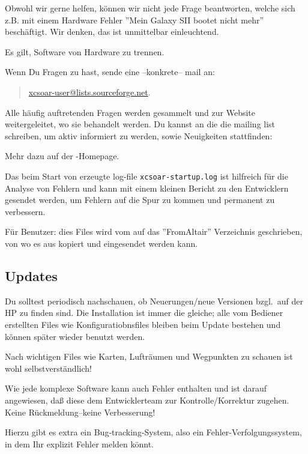 Obwohl wir gerne helfen, können wir nicht jede Frage beantworten, welche sich z.B. mit einem 
Hardware Fehler ''Mein  Galaxy SII bootet nicht mehr'' beschäftigt. Wir denken, das ist unmittelbar einleuchtend.

Es gilt, Software von Hardware zu trennen. 

Wenn Du Fragen zu \xc hast, sende eine --konkrete-- mail an: 

\begin{quote}
\url{xcsoar-user@lists.sourceforge.net}.
\end{quote}

Alle häufig auftretenden Fragen werden gesammelt und zur Website weitergeleitet, wo sie behandelt werden.
Du kannst an die die mailing list schreiben, um aktiv informiert zu werden, sowie Neuigkeiten stattfinden: 

Mehr dazu auf der \xc-Homepage. 

\begin{quote}
\xcsoarwebsite
\end{quote}

Das beim Start von \xc erzeugte log-file \verb|xcsoar-startup.log| ist hilfreich für die Analyse von Fehlern und kann  
mit einem kleinen Bericht zu den Entwicklern gesendet werden, um Fehlern auf die Spur zu kommen 
und \xc permanent zu verbessern. 

Für \al Benutzer: dies Files wird vom \al auf das ''FromAltair'' Verzeichnis geschrieben, von wo es aus kopiert 
und eingesendet werden kann. 

\subsection*{Updates}
Du solltest periodisch nachschauen, ob Neuerungen/neue Versionen  bzgl.\ \xc auf der HP zu finden sind. 
Die Installation ist immer die gleiche; alle vom Bediener erstellten Files wie Konfiguratiobnsfiles 
bleiben beim Update bestehen und können später wieder benutzt werden.

Nach wichtigen Files wie Karten, Lufträumen und Wegpunkten zu schauen ist wohl selbstverständlich!


Wie jede komplexe Software kann auch \xc Fehler enthalten und ist \xc darauf angewiesen, daß diese dem Entwicklerteam zur 
Kontrolle/Korrektur zugehen. Keine Rückmeldung--keine Verbesserung!

Hierzu gibt es extra ein Bug-tracking-System, also ein Fehler-Verfolgungssystem, in dem Ihr explizit Fehler melden könnt.

